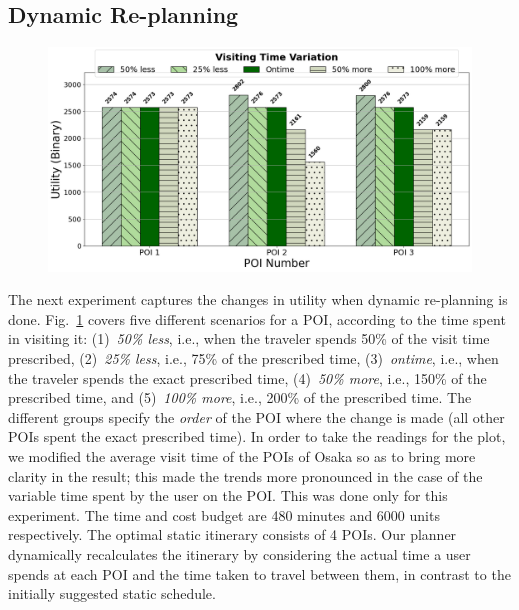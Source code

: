 \subsection{Dynamic Re-planning}

\begin{figure}[th]
    \centering
    \includegraphics[width=\figwidth]{plots/dynamic_pkj.png}
    \label{fig:dynamic}
\end{figure}

The next experiment captures the changes in utility when dynamic re-planning is done.
Fig.~\ref{fig:dynamic} covers five different scenarios for a POI, according to the time spent in visiting it: (1)~\emph{50\% less}, i.e., when the traveler spends 50\% of the visit time prescribed, (2)~\emph{25\% less}, i.e., 75\% of the prescribed time, (3)~\emph{ontime}, i.e., when the traveler spends the exact prescribed time, (4)~\emph{50\% more}, i.e., 150\% of the prescribed time, and (5)~\emph{100\% more}, i.e., 200\% of the prescribed time.
The different groups specify the \emph{order} of the POI where the change is made (all other POIs spent the exact prescribed time).
In order to take the readings for the plot, we modified the average visit time of the POIs of Osaka so as to bring more clarity in the result; this made the trends more pronounced in the case of the variable time spent by the user on the POI.
This was done only for this experiment.
The time and cost budget are 480 minutes and 6000 units respectively.
The optimal static itinerary consists of 4 POIs.
Our planner dynamically recalculates the itinerary by considering the actual time a user spends at each POI and the time taken to travel between them, in contrast to the initially suggested static schedule.


